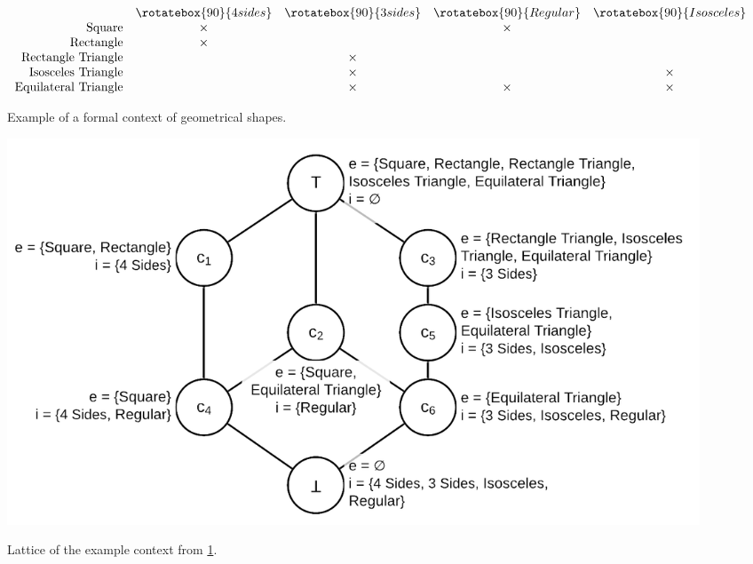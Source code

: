 \begin{figure}
    \centering
        {$\begin{array}{rcccc}
            &\rotatebox{90}{4 sides} & \rotatebox{90}{3 sides} & \rotatebox{90}{Regular} & \rotatebox{90}{Isosceles} \\
            \text{Square} & \times & & \times & \\
            \text{Rectangle} & \times & & & \\
            \text{Rectangle Triangle} & & \times & & \\
            \text{Isosceles Triangle} & & \times &  & \times\\
            \text{Equilateral Triangle} & & \times & \times & \times\\%
        \end{array}$}
    \caption{Example of a formal context of geometrical shapes.\label{fig:context}}
\end{figure}

\begin{figure}
    \centering
    {\includegraphics[keepaspectratio, width=\textwidth]{Figures/Ch0/example_full.png}}
    \caption{Lattice of the example context from \cref{fig:context}.}
    \label{fig:hasse}
\end{figure}

